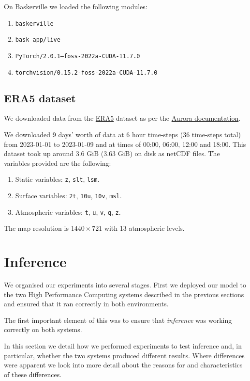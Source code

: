 On Baskerville we loaded the following modules:
\begin{enumerate}
    \item {\tt baskerville}
    \item {\tt bask-app/live}
    \item {\tt PyTorch/2.0.1--foss-2022a-CUDA-11.7.0}
    \item {\tt torchvision/0.15.2-foss-2022a-CUDA-11.7.0}
\end{enumerate}

\subsection{ERA5 dataset}

We downloaded data from the \href{https://cds.climate.copernicus.eu/datasets/reanalysis-era5-single-levels?tab=overview}{ERA5} dataset as per the \href{https://microsoft.github.io/aurora/example_era5.html}{Aurora documentation}.

We downloaded 9 days' worth of data at 6 hour time-steps (36 time-steps total) from 2023-01-01 to 2023-01-09 and at times of 00:00, 06:00, 12:00 and 18:00. This dataset took up around 3.6 GiB (3.63 GiB) on disk as netCDF files. The variables provided are the following:

\begin{enumerate}
\item Static variables: {\tt z}, {\tt slt}, {\tt lsm}.
\item Surface variables: {\tt 2t}, {\tt 10u}, {\tt 10v}, {\tt msl}.
\item Atmospheric variables: {\tt t}, {\tt u}, {\tt v}, {\tt q}, {\tt z}.
\end{enumerate}

The map resolution is $1440 \times 721$ with 13 atmospheric levels.

\section{Inference}

We organised our experiments into several stages. First we deployed our model to the two High Performance Computing systems described in the previous sections and ensured that it ran correctly in both environments.

The first important element of this was to ensure that \textit{inference} was working correctly on both systems.

In this section we detail how we performed experiments to test inference and, in particular, whether the two systems produced different results. Where differences were apparent we look into more detail about the reasons for and characteristics of these differences.

